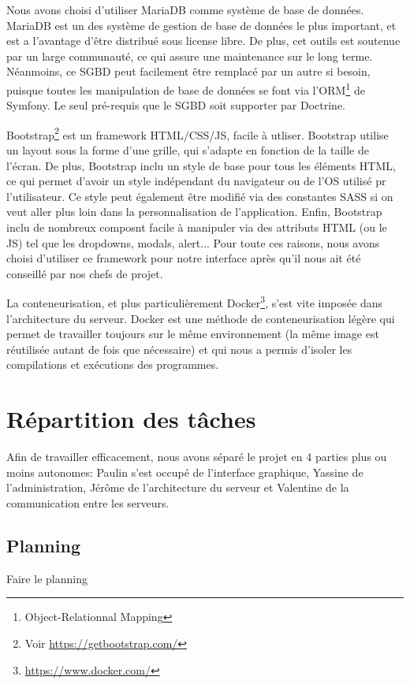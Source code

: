 \par Nous avons choisi d'utiliser MariaDB comme système de base de données. MariaDB est un des système de gestion de base de données le plus important, et est a l'avantage d'être distribué sous license libre. De plus, cet outils est soutenue par un large communauté, ce qui assure une maintenance sur le long terme. Néanmoins, ce SGBD peut facilement être remplacé par un autre si besoin, puisque toutes les manipulation de base de données se font via l'ORM\footnote{Object-Relationnal Mapping} de Symfony. Le seul pré-requis que le SGBD soit supporter par Doctrine.

\par Bootstrap\footnote{Voir \url{https://getbootstrap.com/}} est un framework HTML/CSS/JS, facile à utliser. Bootstrap utilise un layout sous la forme d'une grille, qui s'adapte en fonction de la taille de l'écran. De plus, Bootstrap inclu un style de base pour tous les éléments HTML, ce qui permet d'avoir un style indépendant du navigateur ou de l'OS utilisé pr l'utilisateur. Ce style peut également être modifié via des constantes SASS si on veut aller plus loin dans la personnalisation de l'application. Enfin, Bootstrap inclu de nombreux composnt facile à manipuler via des attributs HTML (ou le JS) tel que les dropdowns, modals, alert... Pour toute ces raisons, nous avons choisi d'utiliser ce framework pour notre interface après qu'il nous ait été conseillé par nos chefs de projet.

\par La conteneurisation, et plus particulièrement Docker\footnote{\url{https://www.docker.com/}}, s'est vite imposée dans l'architecture du serveur. Docker est une méthode de conteneurisation légère qui permet de travailler toujours sur le même environnement (la même image est réutilisée autant de fois que nécessaire) et qui nous a permis d'isoler les compilations et exécutions des programmes.

\section{Répartition des tâches}

\par Afin de travailler efficacement, nous avons séparé le projet en 4 parties plus ou moins autonomes: Paulin s'est occupé de l'interface graphique, Yassine de l'administration, Jérôme de l'architecture du serveur et Valentine de la communication entre les serveurs.

\subsection{Planning}

Faire le planning
